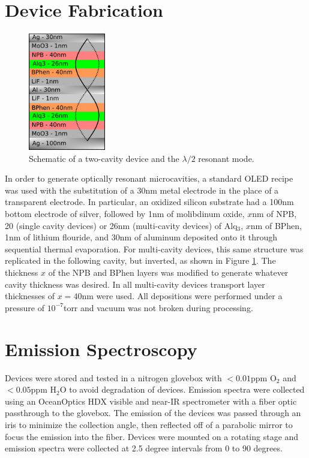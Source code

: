 \documentclass{report}
\begin{document}
    \section{Device Fabrication} \label{fab}
    \begin{figure}
        \centering
        \vspace{-0.5cm}
        \includegraphics[width=0.3\textwidth]{images/schematic.png}
        \caption{\small Schematic of a two-cavity device and the $\lambda/2$ resonant mode.}
        \label{fig:schematic}
        \vspace{-0.5cm}
    \end{figure}
    In order to generate optically resonant microcavities, a standard OLED recipe\cite{Cai2011,Matsushima2008} was used with the substitution of a 30nm metal electrode in the place of a transparent electrode. In particular, an oxidized silicon substrate had a 100nm bottom electrode of silver, followed by 1nm of molibdinum oxide, $x$nm of NPB, 20 (single cavity devices) or 26nm (multi-cavity devices) of Alq$_3$, $x$nm of BPhen, 1nm of lithium flouride, and 30nm of aluminum deposited onto it through sequential thermal evaporation. For multi-cavity devices, this same structure was replicated in the following cavity, but inverted, as shown in Figure \ref{fig:schematic}. The thickness $x$ of the NPB and BPhen layers was modified to generate whatever cavity thickness was desired. In all multi-cavity devices transport layer thicknesses of $x=40$nm were used. All depositions were performed under a pressure of $10^{-7}$torr and vacuum was not broken during processing.

    \section{Emission Spectroscopy} \label{spect}
    Devices were stored and tested in a nitrogen glovebox with $<0.01$ppm O$_2$ and $<0.05$ppm H$_2$O to avoid degradation of devices. Emission spectra were collected using an OceanOptics HDX visible and near-IR spectrometer with a fiber optic passthrough to the glovebox. The emission of the devices was passed through an iris to minimize the collection angle, then reflected off of a parabolic mirror to focus the emission into the fiber. Devices were mounted on a rotating stage and emission spectra were collected at 2.5 degree intervals from 0 to 90 degrees.
\end{document}
